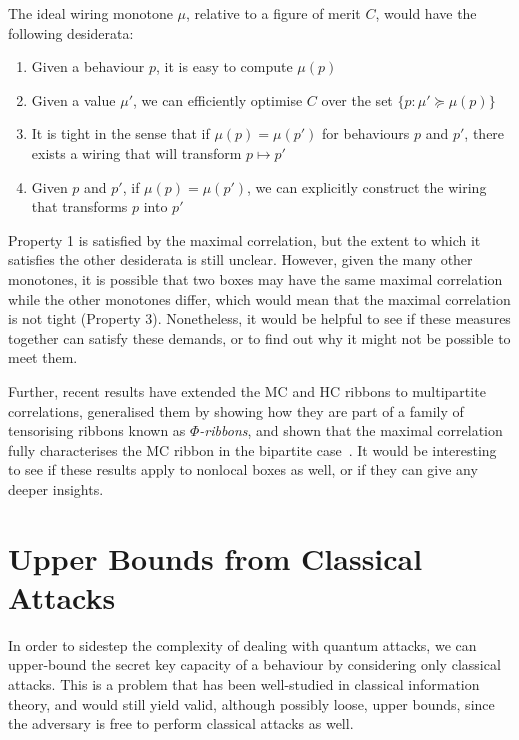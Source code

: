 \documentclass[10pt, a4paper]{article}
\numberwithin{equation}{section} %
\theoremstyle{definition}
\theoremstyle{plain}
\newcommand{\st}{\mathrel{:}} %
\newcommand{\?}{\mathrel{?}} %
\begin{document}
                  The ideal wiring monotone \(\mu\), relative to a figure of merit \(C\), would have the following desiderata:
                  \begin{enumerate}
                    \item Given a behaviour \(p\), it is easy to compute \(\mu(p)\)
                    \item Given a value \(\mu'\), we can efficiently optimise \(C\) over the set \(\{ p \st \mu' \succeq \mu(p) \}\)
                    \item It is tight in the sense that if \(\mu(p) = \mu(p')\) for behaviours \(p\) and \(p'\), there exists a wiring that will transform \(p \mapsto p'\)
                    \item Given \(p\) and \(p'\), if \(\mu(p) = \mu(p')\), we can explicitly construct the wiring that transforms \(p\) into \(p'\)
                  \end{enumerate}

                  Property 1 is satisfied by the maximal correlation, but the extent to which it satisfies the other desiderata is still unclear. However, given the many other monotones, it is possible that two boxes may have the same maximal correlation while the other monotones differ, which would mean that the maximal correlation is not tight (Property 3). Nonetheless, it would be helpful to see if these measures together can satisfy these demands, or to find out why it might not be possible to meet them.

                  Further, recent results have extended the MC and HC ribbons to multipartite correlations, generalised them by showing how they are part of a family of tensorising ribbons known as \emph{\(\Phi\)-ribbons}, and shown that the maximal correlation fully characterises the MC ribbon in the bipartite case~\cite{PhiEntropies}. It would be interesting to see if these results apply to nonlocal boxes as well, or if they can give any deeper insights.

                  \section{Upper Bounds from Classical Attacks}\label{sec:ubound}

                  In order to sidestep the complexity of dealing with quantum attacks, we can upper-bound the secret key capacity of a behaviour by considering only classical attacks. This is a problem that has been well-studied in classical information theory, and would still yield valid, although possibly loose, upper bounds, since the adversary is free to perform classical attacks as well.
\end{document}
